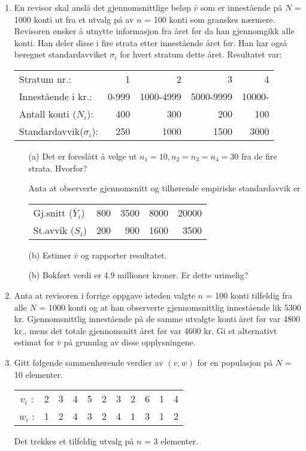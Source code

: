 \begin{enumerate}
\item  En revisor skal anslå det gjennomsnittlige beløp $\bar{v}$ som
er innestående på $N$ = 1000 konti ut fra et utvalg på av
$n$ = 100 konti som granskes nærmere.  Revisoren ønsker å utnytte
informasjon fra året før da han gjennomgikk alle konti.  Han deler
disse i fire strata etter innestående året før.  Han har også
beregnet standardavviket ${\sigma}_i$ for hvert stratum dette året.
Resultatet var:
\begin{center}
\begin{tabular}{lrrrr}
Stratum nr.:              &      1   &     2     &      3     &   4     \\
Innestående i kr.:    &   0-999  & 1000-4999 &  5000-9999 & 10000-  \\
Antall konti ($N_i$):       &     400  &    300    &      200   &  100    \\
Standardavvik(${\sigma}_i$):&     250  &   1000    &     1500   & 3000
\end{tabular}
\end{center}
\begin{itemize}
\item[(a)]  Det er foreslått å velge ut $n_1=10, n_2=n_3=n_4=30$
 fra de fire strata. Hvorfor?

Anta at observerte gjennomsnitt og tilhørende empiriske standardavvik er
\begin{center}
\begin{tabular}{lrrrr}
Gj.snitt ($\bar{Y}_i$)    &    800   &   3500   &   8000   &   20000 \\
St.avvik ($S_i$)          &    200   &    900   &   1600   &    3500
\end{tabular}
\end{center}
\item[(b)]  Estimer $\bar{v}$ og rapporter resultatet.
\item[(b)]  Bokført verdi er 4.9 millioner kroner.  Er dette urimelig?
\end{itemize}

\item  Anta at revisoren i forrige oppgave isteden valgte $n$ = 100 konti
tilfeldig fra alle $N$ = 1000 konti og at han observerte gjennomsnittlig
innestående lik 5300 kr.  Gjennomsnittlig innestående på de
samme utvalgte konti året før var 4800 kr., mens det totale 
gjennomsnitt året før var 4600 kr.  Gi et alternativt estimat for
$\bar{v}$ på grunnlag av disse opplysningene.

\item  Gitt følgende sammenhørende verdier av $(v,w)$ for en 
populasjon på $N$ = 10 elementer.
\begin{center}
\begin{tabular}{ccccccccccc}
 $v_i$ :   &  2  &  3  &  4  &  5  &  2  &  3  &  2  &  6  &  1  &  4 \\
 $w_i$ :   &  1  &  2  &  4  &  3  &  2  &  4  &  1  &  3  &  1  &  2
\end{tabular}
\end{center}
Det trekkes et tilfeldig utvalg på $n$ = 3 elementer.


\end{enumerate}
